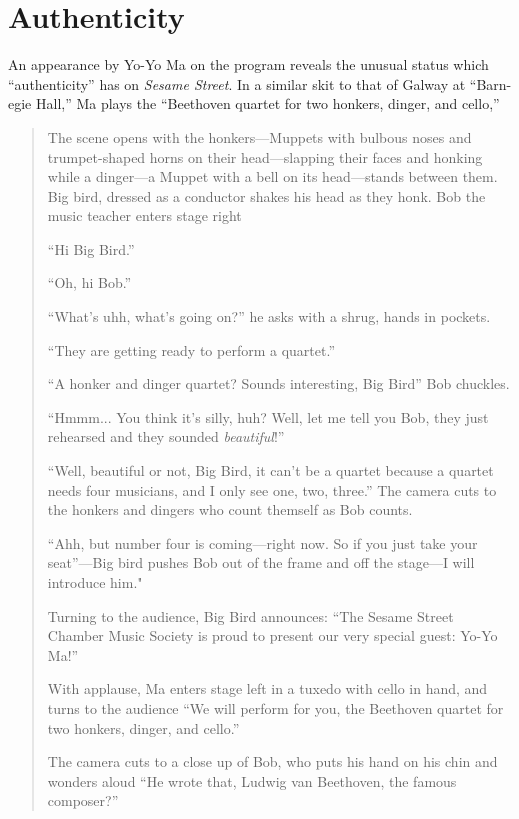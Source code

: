 \documentclass[12pt,letterpaper]{article}
\begin{document}
	\section*{Authenticity}

	An appearance by Yo-Yo Ma on the program reveals the unusual status 
	which ``authenticity'' has on \textit{Sesame Street}. In a similar 
	skit to that of Galway at ``Barn-egie Hall,'' Ma plays the 
	``Beethoven quartet for two honkers, dinger, and cello,'' 

	\begin{quote}

	\ttfamily

	The scene opens with the honkers---Muppets with bulbous noses and
	trumpet-shaped horns on their head---slapping their faces and honking 
	while a dinger---a Muppet with a bell on its head---stands between them.
	Big bird, dressed as a conductor shakes his head as they honk. Bob the
	music teacher enters stage right 

	``Hi Big Bird.''

	``Oh, hi Bob.''

	``What's uhh, what's going on?'' he asks with a shrug, hands in pockets.

	``They are getting ready to perform a quartet.''

	``A honker and dinger quartet? Sounds interesting, Big Bird'' Bob 
	chuckles.

	``Hmmm... You think it's silly, huh? Well, let me tell you Bob, they 
	just rehearsed and they sounded \textit{beautiful}!''

	``Well, beautiful or not, Big Bird, it can't be a quartet because a 
	quartet needs four musicians, and I only see one, two, three.'' The 
	camera cuts to the honkers and dingers who count themself as Bob counts.

	``Ahh, but number four is coming---right now. So if you just take your 
	seat''---Big bird pushes Bob out of the frame and off the stage---I will
	introduce him."

	Turning to the audience, Big Bird announces: ``The Sesame Street Chamber
	Music Society is proud to present our very special guest: Yo-Yo Ma!''

	With applause, Ma enters stage left in a tuxedo with cello in hand, and
	turns to the audience ``We will perform for you, the Beethoven quartet 
	for two honkers, dinger, and cello.'' 

	The camera cuts to a close up of Bob, who puts his hand on his chin and 	wonders aloud ``He wrote that, Ludwig van Beethoven, the famous 
	composer?''


\end{quote}
\end{document}
